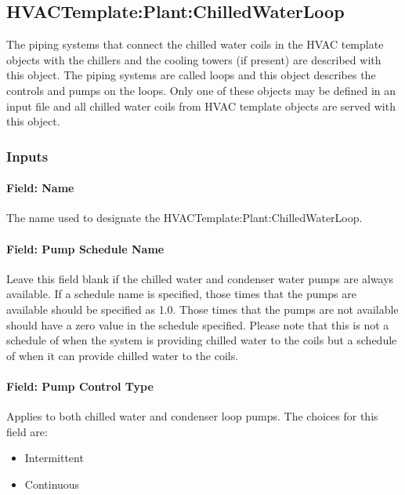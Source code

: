 \subsection{HVACTemplate:Plant:ChilledWaterLoop}\label{hvactemplateplantchilledwaterloop}

The piping systems that connect the chilled water coils in the HVAC template objects with the chillers and the cooling towers (if present) are described with this object. The piping systems are called loops and this object describes the controls and pumps on the loops. Only one of these objects may be defined in an input file and all chilled water coils from HVAC template objects are served with this object.

\subsubsection{Inputs}\label{inputs-23-001}

\paragraph{Field: Name}\label{field-name-2016-06-16-1622}

The name used to designate the HVACTemplate:Plant:ChilledWaterLoop.

\paragraph{Field: Pump Schedule Name}\label{field-pump-schedule-name}

Leave this field blank if the chilled water and condenser water pumps are always available. If a schedule name is specified, those times that the pumps are available should be specified as 1.0. Those times that the pumps are not available should have a zero value in the schedule specified. Please note that this is not a schedule of when the system is providing chilled water to the coils but a schedule of when it can provide chilled water to the coils.

\paragraph{Field: Pump Control Type}\label{field-pump-control-type}

Applies to both chilled water and condenser loop pumps. The choices for this field are:

\begin{itemize}
\item
  Intermittent
\item
  Continuous
\end{itemize}

